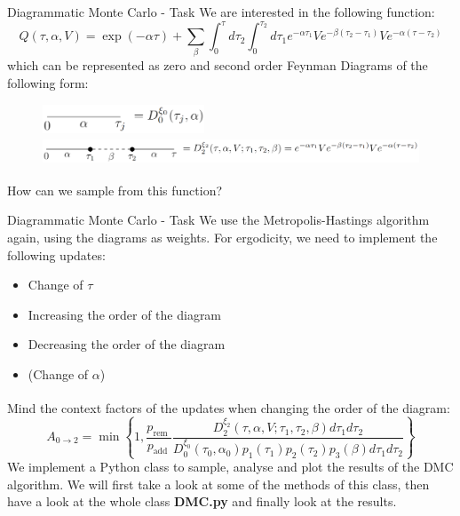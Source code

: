 \documentclass[10pt,xcolor=table, aspectratio=1610]{beamer}
\newcommand{\supercitepage}[2][]{\textsuperscript{\cite[#1]{#2}}}
\begin{document}
\begin{frame}[containsverbatim]{Diagrammatic Monte Carlo - Task}
We are interested in the following function:
\begin{equation*}
  Q(\tau, \alpha, V)=\exp (-\alpha \tau)+\sum_\beta \int_0^\tau d \tau_2 \int_0^{\tau_2} d \tau_1 e^{-\alpha \tau_1} V e^{-\beta\left(\tau_2-\tau_1\right)} V e^{-\alpha\left(\tau-\tau_2\right)}
\end{equation*}
which can be represented as zero and second order \alert{Feynman Diagrams} of the following form:
\begin{figure}
  \centering
  \includegraphics[height=24pt]{images/feynman1.png}

  \includegraphics[height=24pt]{images/feynman2.png}
\end{figure}
How can we sample from this function?
\end{frame}

\begin{frame}[containsverbatim]{Diagrammatic Monte Carlo - Task}
  We use the \alert{Metropolis-Hastings algorithm} again, using the diagrams as 
  weights. For ergodicity, we need to implement the following updates:
  \begin{itemize}
    \item Change of $\tau$
    \item Increasing the order of the diagram
    \item Decreasing the order of the diagram
    \item (Change of $\alpha$)
  \end{itemize}
Mind the context factors of the updates when changing the order of the diagram\supercitepage[ch. 12.3.1.2]{fehske}:
\begin{equation*}
  A_{0 \rightarrow 2}=\min \left\{1, \frac{p_{\text {rem }}}{p_{\text {add }}} \frac{D_2^{\xi_2}\left(\tau, \alpha, V ; \tau_1, \tau_2, \beta\right) d \tau_1 d \tau_2}{D_0^{\xi_0}\left(\tau_0, \alpha_0\right) p_1\left(\tau_1\right) p_2\left(\tau_2\right) p_3(\beta) d \tau_1 d \tau_2}\right\}
\end{equation*}
We implement a Python class to sample, analyse and plot the results of the DMC algorithm.
We will first take a look at some of the methods of this class, then have a look at the
whole class \textbf{DMC.py} and finally look at the results.
\end{frame}
\end{document}
